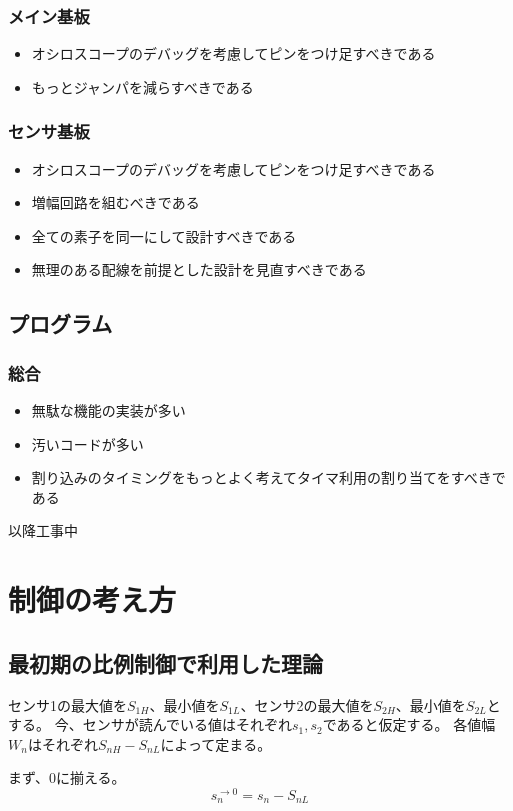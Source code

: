 \documentclass[a4paper]{ltjsarticle}
\begin{document}
\subsubsection{メイン基板}
\begin{itemize}
  \item オシロスコープのデバッグを考慮してピンをつけ足すべきである
  \item もっとジャンパを減らすべきである
\end{itemize}
\subsubsection{センサ基板}
\begin{itemize}
  \item オシロスコープのデバッグを考慮してピンをつけ足すべきである
  \item 増幅回路を組むべきである
  \item 全ての素子を同一にして設計すべきである
  \item 無理のある配線を前提とした設計を見直すべきである
\end{itemize}
\subsection{プログラム}
\subsubsection{総合}
\begin{itemize}
  \item 無駄な機能の実装が多い
  \item 汚いコードが多い
  \item 割り込みのタイミングをもっとよく考えてタイマ利用の割り当てをすべきである
\end{itemize}
以降工事中


\section{制御の考え方}
\subsection{最初期の比例制御で利用した理論}
センサ1の最大値を$S_{1H}$、最小値を$S_{1L}$、センサ2の最大値を$S_{2H}$、最小値を$S_{2L}$とする。
今、センサが読んでいる値はそれぞれ$s_{1},s_{2}$であると仮定する。
各値幅$W_{n}$はそれぞれ$S_{nH}-S_{nL}$によって定まる。

まず、0に揃える。
\begin{equation}
  s^{\to 0}_{n} = s_n-S_{nL}
\end{equation}
\end{document}
